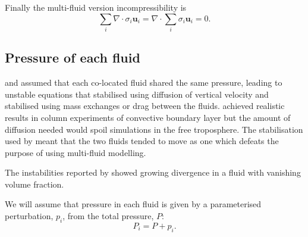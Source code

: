 \documentclass[draft]{agujournal2019}
\begin{document}
Finally the multi-fluid version incompressibility is
\begin{equation}
\sum_{i}\nabla\cdot\sigma_{i}\mathbf{u}_{i}  = \nabla\cdot\sum_{i}\sigma_{i}\mathbf{u}_{i}=0.
\label{eq:divFree}
\end{equation}

\subsection{Pressure of each fluid \label{subsec:fluidPressure}}

 and  assumed that each co-located fluid
shared the same pressure, leading to unstable equations that 
stabilised using diffusion of vertical velocity and 
stabilised using mass exchanges or drag between the fluids. 
achieved realistic results in  column experiments of convective
boundary layer but the amount of diffusion needed would spoil simulations
in the free troposphere. The stabilisation used by  meant
that the two fluids tended to move as one which defeats the purpose
of using multi-fluid modelling. 

The instabilities reported by  showed growing divergence
in a fluid with vanishing volume fraction. 

We will assume that pressure in each fluid is given by a parameterised
perturbation, $p_{i}$, from the total pressure, $P$:
\begin{equation}
P_{i}=P+p_{i}.
\end{equation}
  

\subsubsection{}
\end{document}
